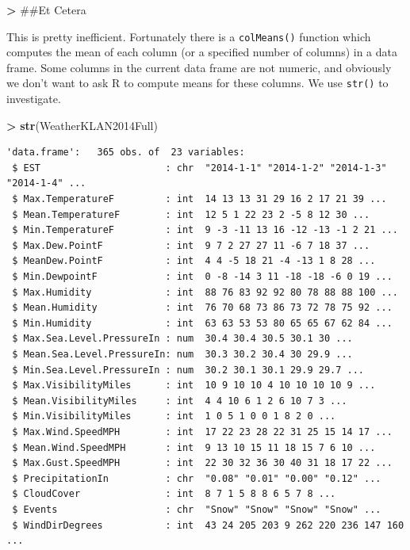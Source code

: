 \documentclass[]{krantz}
\makeatletter
\newenvironment{Shaded}{\begin{snugshade}}{\end{snugshade}}
\newcommand{\KeywordTok}[1]{\textcolor[rgb]{0.27,0.27,0.27}{\textbf{#1}}}
\newcommand{\StringTok}[1]{\textcolor[rgb]{0.5,0.5,0.5}{#1}}
\newcommand{\OperatorTok}[1]{\textcolor[rgb]{0.43,0.43,0.43}{\textbf{#1}}}
\newcommand{\NormalTok}[1]{#1}
\newenvironment{kframe}{%
\medskip{}
\setlength{\fboxsep}{.8em}
 \def\at@end@of@kframe{}%
 \ifinner\ifhmode%
  \def\at@end@of@kframe{\end{minipage}}%
  \begin{minipage}{\columnwidth}%
 \fi\fi%
 \def\FrameCommand##1{\hskip\@totalleftmargin \hskip-\fboxsep
 \colorbox{shadecolor}{##1}\hskip-\fboxsep
     \hskip-\linewidth \hskip-\@totalleftmargin \hskip\columnwidth}%
 \MakeFramed {\advance\hsize-\width
   \@totalleftmargin\z@ \linewidth\hsize
   \@setminipage}}%
 {\par\unskip\endMakeFramed%
 \at@end@of@kframe}
\renewenvironment{Shaded}{\begin{kframe}}{\end{kframe}}
\makeatother
\begin{document}
\begin{Shaded}
\begin{Highlighting}[]
\OperatorTok{>}\StringTok{ }\NormalTok{##Et Cetera}
\end{Highlighting}
\end{Shaded}

This is pretty inefficient. Fortunately there is a \texttt{colMeans()}
function which computes the mean of each column (or a specified number
of columns) in a data frame. Some columns in the current data frame are
not numeric, and obviously we don't want to ask R to compute means for
these columns. We use \texttt{str()} to investigate.

\begin{Shaded}
\begin{Highlighting}[]
\OperatorTok{>}\StringTok{ }\KeywordTok{str}\NormalTok{(WeatherKLAN2014Full)}
\end{Highlighting}
\end{Shaded}

\begin{verbatim}
'data.frame':   365 obs. of  23 variables:
 $ EST                      : chr  "2014-1-1" "2014-1-2" "2014-1-3" "2014-1-4" ...
 $ Max.TemperatureF         : int  14 13 13 31 29 16 2 17 21 39 ...
 $ Mean.TemperatureF        : int  12 5 1 22 23 2 -5 8 12 30 ...
 $ Min.TemperatureF         : int  9 -3 -11 13 16 -12 -13 -1 2 21 ...
 $ Max.Dew.PointF           : int  9 7 2 27 27 11 -6 7 18 37 ...
 $ MeanDew.PointF           : int  4 4 -5 18 21 -4 -13 1 8 28 ...
 $ Min.DewpointF            : int  0 -8 -14 3 11 -18 -18 -6 0 19 ...
 $ Max.Humidity             : int  88 76 83 92 92 80 78 88 88 100 ...
 $ Mean.Humidity            : int  76 70 68 73 86 73 72 78 75 92 ...
 $ Min.Humidity             : int  63 63 53 53 80 65 65 67 62 84 ...
 $ Max.Sea.Level.PressureIn : num  30.4 30.4 30.5 30.1 30 ...
 $ Mean.Sea.Level.PressureIn: num  30.3 30.2 30.4 30 29.9 ...
 $ Min.Sea.Level.PressureIn : num  30.2 30.1 30.1 29.9 29.7 ...
 $ Max.VisibilityMiles      : int  10 9 10 10 4 10 10 10 10 9 ...
 $ Mean.VisibilityMiles     : int  4 4 10 6 1 2 6 10 7 3 ...
 $ Min.VisibilityMiles      : int  1 0 5 1 0 0 1 8 2 0 ...
 $ Max.Wind.SpeedMPH        : int  17 22 23 28 22 31 25 15 14 17 ...
 $ Mean.Wind.SpeedMPH       : int  9 13 10 15 11 18 15 7 6 10 ...
 $ Max.Gust.SpeedMPH        : int  22 30 32 36 30 40 31 18 17 22 ...
 $ PrecipitationIn          : chr  "0.08" "0.01" "0.00" "0.12" ...
 $ CloudCover               : int  8 7 1 5 8 8 6 5 7 8 ...
 $ Events                   : chr  "Snow" "Snow" "Snow" "Snow" ...
 $ WindDirDegrees           : int  43 24 205 203 9 262 220 236 147 160 ...
\end{verbatim}
\end{document}
